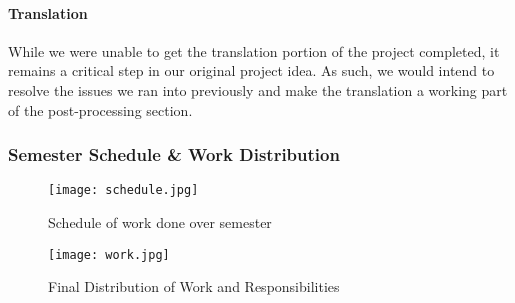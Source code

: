 \paragraph{Translation} While we were unable to get the 
translation portion of the project completed, it remains 
a critical step in our original project idea. As such, 
we would intend to resolve the issues we ran into previously 
and make the translation a working part of the post-processing section.


\subsubsection{Semester Schedule \& Work Distribution}
\begin{figure}[!]
		\texttt{[image: schedule.jpg]}\\
		\caption{Schedule of work done over semester}
		\label{fig:sch}
\end{figure}

\begin{figure}[!]
		\texttt{[image: work.jpg]}\\
		\caption{Final Distribution of Work and Responsibilities}
		\label{fig:work}
\end{figure}